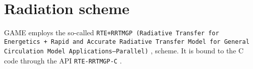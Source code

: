 \documentclass[10pt]{report}
\begin{document}
\chapter{Radiation scheme}
\label{chap:radiation_scheme}

GAME employs the so-called \texttt{RTE+RRTMGP (Radiative Transfer for Energetics + Rapid and Accurate Radiative Transfer Model for General Circulation Model Applications—Parallel)} \cite{doi:10.1029/2019MS001621}, \cite{rte-rrtmgp-github} scheme. It is bound to the C code through the API \texttt{RTE-RRTMGP-C} \cite{rte-rrtmgp-c-github}.

\appendix

\printbibliography
\end{document}
